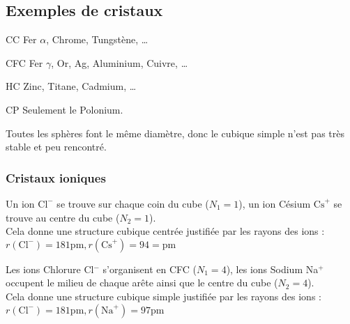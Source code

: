 \subsection*{Exemples de cristaux}
\begin{ex}
    \begin{compactdesc}
        \item[CC] Fer $\alpha$, Chrome, Tungstène, \dots
        \item[CFC] Fer $\gamma$, Or, Ag, Aluminium, Cuivre, \dots
        \item[HC] Zinc, Titane, Cadmium, \dots
        \item[CP] Seulement le Polonium.
    \end{compactdesc}
\end{ex}
\begin{rem}
    Toutes les sphères font le même diamètre, donc le cubique simple n'est pas
    très stable et peu rencontré.
\end{rem}

\subsubsection*{Cristaux ioniques}
\begin{ex}
    Un ion $\text{Cl}^-$ se trouve sur chaque coin du cube ($N_1 = 1$), un ion
    Césium $\text{Cs}^+$ se trouve au centre du cube ($N_2 = 1$).\\
    Cela donne une structure cubique centrée justifiée par les rayons des ions
    : $r(\text{Cl}^-) = 181\text{pm}, r(\text{Cs}^+) = 94 =\text{pm}$
\end{ex}
\begin{ex}
    Les ions Chlorure Cl$^-$ s'organisent en CFC ($N_1 = 4$), les ions Sodium
    Na$^+$ occupent le milieu de chaque arête ainsi que le centre du cube
    ($N_2 = 4$).\\
    Cela donne une structure cubique simple justifiée par les rayons des
    ions :
    $r(\text{Cl}^-) = 181\text{pm}, r(\text{Na}^+) = 97\text{pm}$
\end{ex}

